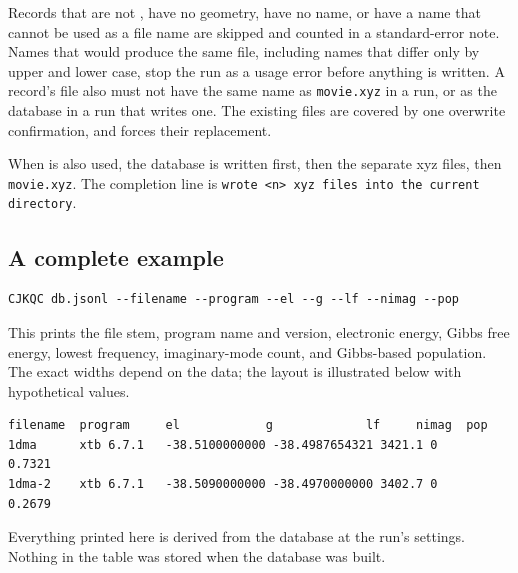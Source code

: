 Records that are not , have no geometry, have no name, or have a name
that cannot be used as a file name are skipped and counted in a
standard-error note. Names that would produce the same file, including names
that differ only by upper and lower case, stop the run as a usage error
before anything is written. A record's file also must not have the same name
as \texttt{movie.xyz} in a  run, or as the  database
in a run that writes one. The existing files are covered by one overwrite
confirmation, and  forces their replacement.

When  is also used, the database is written first, then the
separate xyz files, then \texttt{movie.xyz}. The completion line is
\texttt{wrote <n> xyz files into the current directory}.

\subsection{A complete example}\label{sec:printing-example}

\begin{verbatim}
CJKQC db.jsonl --filename --program --el --g --lf --nimag --pop
\end{verbatim}

This prints the file stem, program name and version, electronic energy,
Gibbs free energy, lowest frequency, imaginary-mode count, and Gibbs-based
population. The exact widths depend on the data; the layout is illustrated
below with hypothetical values.

\begin{verbatim}
filename  program     el            g             lf     nimag  pop
1dma      xtb 6.7.1   -38.5100000000 -38.4987654321 3421.1 0      0.7321
1dma-2    xtb 6.7.1   -38.5090000000 -38.4970000000 3402.7 0      0.2679
\end{verbatim}

Everything printed here is derived from the database at the run's settings.
Nothing in the table was stored when the database was built.
